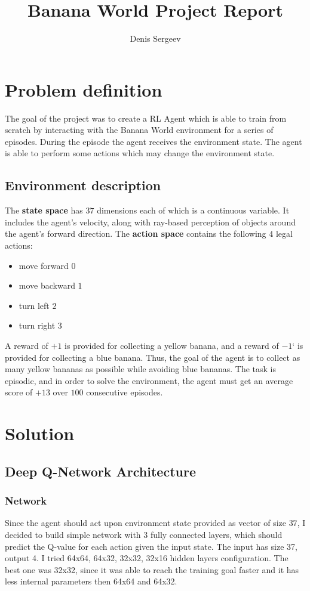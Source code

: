 \documentclass{report}
\begin{document}
\title{Banana World Project Report}
\author{Denis Sergeev}


\section*{Problem definition}

The goal of the project was to create a RL Agent which is able to train from scratch by interacting with the Banana World environment for a series of episodes. During the episode the agent receives the environment state. The agent is able to perform some actions which may change the environment state.

\subsection*{Environment description}
The \textbf{state space} has \(37\) dimensions each of which is a continuous variable. It includes the agent's velocity, along with ray-based perception of objects around the agent's forward direction. The \textbf{action space} contains the following \(4\) legal actions:
\begin{itemize}
  \item move forward \(0\)
  \item move backward \(1\)
  \item turn left \(2\)
  \item turn right \(3\)
\end{itemize}
A reward of \(+1\) is provided for collecting a yellow banana, and a reward of \(-1\)` is provided for collecting a blue banana. Thus, the goal of the agent is to collect as many yellow bananas as possible while avoiding blue bananas. The task is episodic, and in order to solve the environment, the agent must get an average score of \(+13\) over \(100\) consecutive episodes.


\section*{Solution}
\subsection*{Deep Q-Network Architecture}
\subsubsection*{Network}
Since the agent should act upon environment state provided as vector of size \(37\), I decided to build simple network with \(3\) fully connected layers, which should predict the Q-value for each action given the input state. The input has size 37, output 4. I tried 64x64, 64x32, 32x32, 32x16 hidden layers configuration. The best one was 32x32, since it was able to reach the training goal faster and it has less internal parameters then 64x64 and 64x32.
\end{document}
